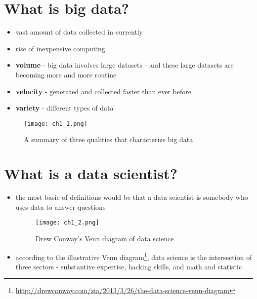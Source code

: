 \documentclass[11pt,fancy]{elegantbook}
\begin{document}
\section{What is big data?}
\begin{itemize}
    \item vast amount of data collected in currently
    \item rise of inexpensive computing
    \item \textbf{volume} - big data involves large datasets - and these large datasets are becoming more and more routine
    \item \textbf{velocity} - generated and collected faster than ever before
    \item \textbf{variety} - different types of data
\end{itemize}
\begin{figure}[H]
    \centering
    \texttt{[image: ch1\_1.png]}
    \caption{A summary of three qualities that characterize big data}
    \label{fig:big_data}
\end{figure}

\section{What is a data scientist?}
\begin{itemize}
    \item the most basic of definitions would be that a data scientist is somebody who uses data to answer questions
          \begin{figure}[H]
              \centering
              \texttt{[image: ch1\_2.png]}
              \caption{Drew Conway's Venn diagram of data science}
              \label{fig:data_scientist_dia}
          \end{figure}
    \item according to the illustrative Venn diagram\footnote{\url{http://drewconway.com/zia/2013/3/26/the-data-science-venn-diagram}}, data science is the intersection of three sectors - substantive expertise, hacking skills, and math and statistic
\end{itemize}
\end{document}
